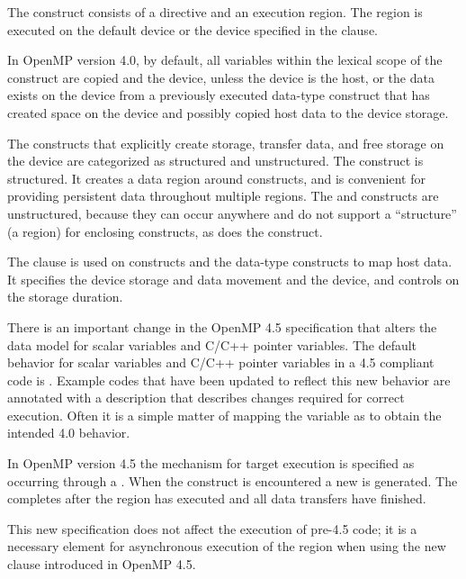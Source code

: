 \label{chap:devices}

The  construct consists of a  directive 
and an execution region. The  region is executed on
the default device or the device specified in the  
clause. 

In OpenMP version 4.0, by default, all variables within the lexical
scope of the construct are copied  and  the
device, unless the device is the host, or the data exists on the
device from a previously executed data-type construct that
has created space on the device and possibly copied host
data to the device storage.

The constructs that explicitly
create storage, transfer data, and free storage on the device
are categorized as structured and unstructured. The
  construct is structured. It creates
a data region around  constructs, and is
convenient for providing persistent data throughout multiple
 regions. The    and 
   constructs are unstructured, because 
they can occur anywhere and do not support a ``structure''
(a region) for enclosing  constructs, as does the
  construct. 

The  clause is used on  
constructs and the data-type constructs to map host data. It 
specifies the device storage and data movement  and 
the device, and controls on the storage duration.

There is an important change in the OpenMP 4.5 specification
that alters the data model for scalar variables and C/C++ pointer variables.
The default behavior for scalar variables and C/C++ pointer variables
in a 4.5 compliant code is . Example
codes that have been updated to reflect this new behavior are
annotated with a description that describes changes required
for correct execution. Often it is a simple matter of mapping
the variable as  to obtain the intended 4.0 behavior.

In OpenMP version 4.5 the mechanism for target
execution is specified as occurring through a . 
When the  construct is encountered a new 
 is generated. The  
completes after the  region has executed and all data 
transfers have finished.

This new specification does not affect the execution of 
pre-4.5 code; it is a necessary element for asynchronous 
execution of the  region when using the new  
clause introduced in OpenMP 4.5.


